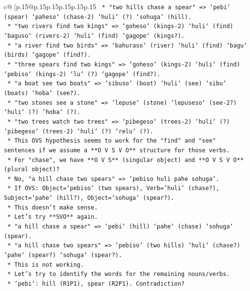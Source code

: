 \documentclass{article}
\begin{document}
{\begin{supertabular}{c@{$\;$}|p{.15\linewidth}@{}p{.15\linewidth}p{.15\linewidth}p{.15\linewidth}p{.15\linewidth}p{.15\linewidth}}
{{{\texttt{            *   "two hills chase a spear" => `pebi` (spear) `paheso` (chase{-}2) `huli` (?) `sohuga` (hill).} \\
\texttt{            *   "two rivers find two kings" => `goheso` (kings{-}2) `huli` (find) `baguso` (rivers{-}2) `huli` (find) `gagope` (kings?).} \\
\texttt{            *   "a river find two birds" => `bahuraso` (river) `huli` (find) `bagu` (birds) `gagope` (find?).} \\
\texttt{            *   "three spears find two kings" => `goheso` (kings{-}2) `huli` (find) `pebiso` (kings{-}2) `lu` (?) `gagope` (find?).} \\
\texttt{            *   "a boat see two boats" => `sibuso` (boat) `huli` (see) `sibu` (boats) `hoba` (see?).} \\
\texttt{            *   "two stones see a stone" => `lepuse` (stone) `lepuseso` (see{-}2?) `huli` (?) `hoba` (?).} \\
\texttt{            *   "two trees watch two trees" => `pibegeso` (trees{-}2) `huli` (?) `pibegeso` (trees{-}2) `huli` (?) `relu` (?).} \\
\texttt{            *   This OVS hypothesis seems to work for the "find" and "see" sentences if we assume a **O V S V O** structure for those verbs.} \\
\texttt{            *   For "chase", we have **O V S** (singular object) and **O V S V O** (plural object)?} \\
\texttt{            *   No, "a hill chase two spears" => `pebiso huli pahe sohuga`.} \\
\texttt{                *   If OVS: Object=`pebiso` (two spears), Verb=`huli` (chase?), Subject=`pahe` (hill?), Object=`sohuga` (spear?).} \\
\texttt{                *   This doesn't make sense.} \\
\texttt{            *   Let's try **SVO** again.} \\
\texttt{                *   "a hill chase a spear" => `pebi` (hill) `pahe` (chase) `sohuga` (spear).} \\
\texttt{                *   "a hill chase two spears" => `pebiso` (two hills) `huli` (chase?) `pahe` (spear?) `sohuga` (spear?).} \\
\texttt{                *   This is not working.} \\
\texttt{        *   Let's try to identify the words for the remaining nouns/verbs.} \\
\texttt{            *   `pebi`: hill (R1P1), spear (R2P1). Contradiction?} \\
}}}
\end{supertabular}}
\end{document}
